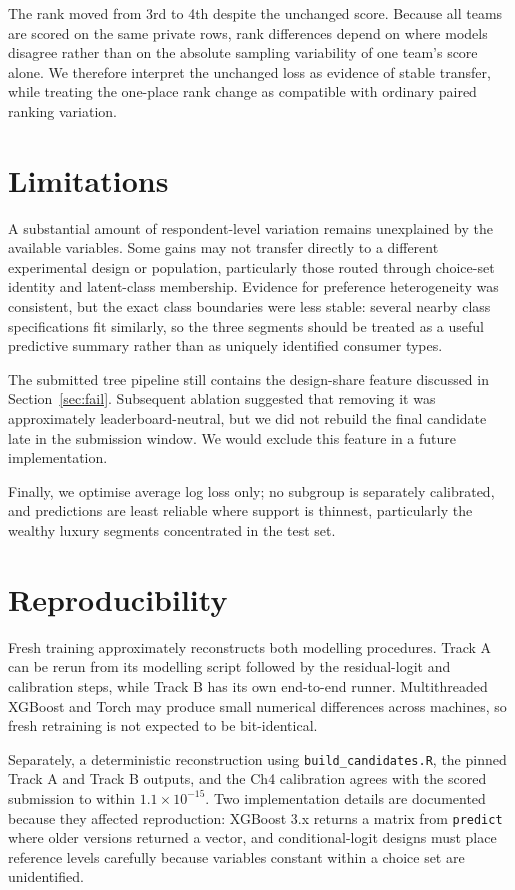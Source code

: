 \documentclass[11pt]{article}
\begin{document}
The rank moved from 3rd to 4th despite the unchanged score. Because all teams are scored
on the same private rows, rank differences depend on where models disagree rather than on
the absolute sampling variability of one team's score alone. We therefore interpret the
unchanged loss as evidence of stable transfer, while treating the one-place rank change as
compatible with ordinary paired ranking variation.

\section{Limitations}\label{sec:limits}

A substantial amount of respondent-level variation remains unexplained by the available
variables. Some gains may not transfer directly to a different experimental design or
population, particularly those routed through choice-set identity and latent-class
membership. Evidence for preference heterogeneity was consistent, but the exact class
boundaries were less stable: several nearby class specifications fit similarly, so the
three segments should be treated as a useful predictive summary rather than as uniquely
identified consumer types.

The submitted tree pipeline still contains the design-share feature discussed in
Section~\ref{sec:fail}. Subsequent ablation suggested that removing it was approximately
leaderboard-neutral, but we did not rebuild the final candidate late in the submission
window. We would exclude this feature in a future implementation.

Finally, we optimise average log loss only; no subgroup is separately calibrated, and
predictions are least reliable where support is thinnest, particularly the wealthy luxury
segments concentrated in the test set.

\section{Reproducibility}\label{sec:repro}

Fresh training approximately reconstructs both modelling procedures. Track A can be
rerun from its modelling script followed by the residual-logit and calibration steps,
while Track B has its own end-to-end runner. Multithreaded XGBoost and Torch may produce
small numerical differences across machines, so fresh retraining is not expected to be
bit-identical.

Separately, a deterministic reconstruction using \texttt{build\_candidates.R}, the
pinned Track A and Track B outputs, and the Ch4 calibration agrees with the scored
submission to within $1.1\times10^{-15}$. Two implementation details are documented because
they affected reproduction: XGBoost 3.x returns a matrix from \texttt{predict} where
older versions returned a vector, and conditional-logit designs must place reference
levels carefully because variables constant within a choice set are unidentified.
\end{document}
